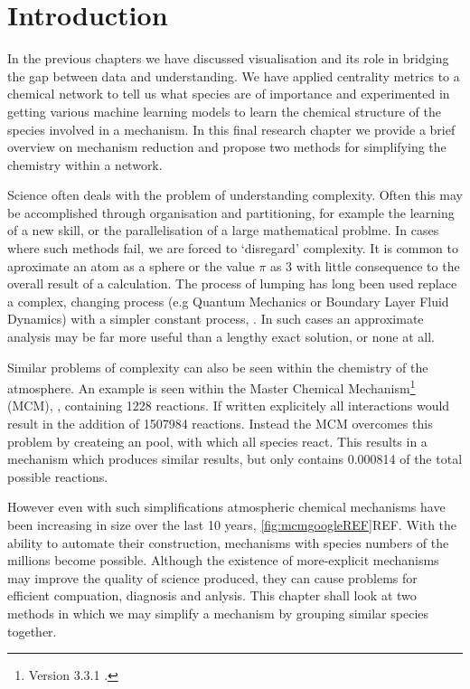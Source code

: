 
\section{Introduction}

In the previous chapters we have discussed visualisation and its role in bridging the gap between data and understanding. We have applied centrality metrics to a chemical network to tell us what species are of importance and experimented in getting various machine learning models to learn the chemical structure of the species involved in a mechanism. In this final research chapter we provide a brief overview on mechanism reduction and propose two methods for simplifying the chemistry within a network. 

Science often deals with the problem of understanding complexity. Often this may be accomplished through organisation and partitioning, for example the learning of a new skill, or the parallelisation of a large mathematical problme. In cases where such methods fail, we are forced to `disregard' complexity. It is common to aproximate an atom as a sphere or the value $\pi$ as 3 with little consequence to the overall result of a calculation. The process of lumping has long been used replace a complex, changing process (e.g Quantum Mechanics or Boundary Layer Fluid Dynamics) with a simpler constant process, \citep{approx}. In such cases an approximate analysis may be far more useful than a lengthy exact solution, or none at all. 

Similar problems of complexity can also be seen within the chemistry of the atmosphere. An example is seen within the Master Chemical Mechanism\footnote{Version 3.3.1 .} (MCM), \citep{mcm}, containing 1228  reactions. If written explicitely all  interactions would result in the addition of 1507984 reactions. Instead the MCM overcomes this problem by createing an  pool, with which all  species react. This results in a mechanism which produces similar results, but only contains 0.000814 of the total possible  reactions.

However even with such simplifications atmospheric chemical mechanisms have been increasing in size over the last 10 years, \autoref{fig:mcmgoogleREF}REF. With the ability to automate their construction, mechanisms with species numbers of the millions become possible. Although the existence of more-explicit mechanisms may improve the quality of science produced, they can cause problems for efficient compuation, diagnosis and anlysis. This chapter shall look at two methods in which we may simplify a mechanism by grouping similar species together.


